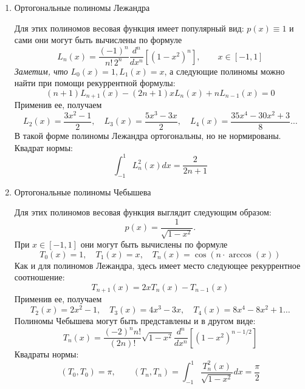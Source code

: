 \begin{enumerate}
    \item Ортогональные полиномы Лежандра
    \vspace{5pt}

    Для этих полиномов весовая функция имеет популярный вид: $p(x) \equiv 1$ и сами они
    могут быть вычислены по формуле
    \begin{equation}
        \displaystyle L_n(x) = \frac{(-1)^n}{n!\, 2^n} \frac{d^n}{dx^n} \left[ \left( 1 - x^2 \right)^n \right], \qquad x \in [-1, 1] \label{eq:legendre}
    \end{equation}
    \emph{Заметим, что} $ \displaystyle L_0(x) = 1, L_1(x) = x$, а следующие полиномы
    можно найти при помощи рекуррентной формулы:
    \begin{equation*}
    (n+1)
        L_{n+1}(x) - (2n+1)xL_n(x) + nL_{n-1}(x) = 0
    \end{equation*}
    Применив ее, получаем
    \begin{equation*}
        L_2(x) = \frac{3x^2-1}{2}, \quad L_3(x) = \frac{5x^3-3x}{2}, \quad L_4(x) = \frac{35x^4-30x^2+3}{8}\dots
    \end{equation*}
    В такой форме полиномы Лежандра ортогональны, но не нормированы. Квадрат нормы:
    \begin{equation*}
        \int_{-1}^{1} L_n^2(x)dx = \frac{2}{2n+1}
    \end{equation*}

    \item Ортогональные полиномы Чебышева
    \vspace{5pt}

    Для этих полиномов весовая функция выглядит следующим образом:
    \begin{equation*}
        p(x) = \frac{1}{\sqrt{1-x^2}}.
    \end{equation*}
    При $x \in [-1, 1]$ они могут быть вычислены по формуле
    \begin{equation}
        T_0(x) = 1, \quad T_1(x) = x, \quad T_n(x) = \cos \left( n \cdot \arccos(x) \right) \label{eq:chebyshev}
    \end{equation}
    Как и для полиномов Лежандра, здесь имеет место следующее рекуррентное соотношение:
    \begin{equation*}
        T_{n+1}(x) = 2xT_n(x) - T_{n-1}(x)
    \end{equation*}
    Применив ее, получаем
    \begin{equation*}
        T_2(x) = 2x^2 - 1, \quad T_3(x) = 4x^3 -3x, \quad T_4(x) = 8x^4 -8x^2 + 1\dots
    \end{equation*}
    Полиномы Чебышева могут быть представлены и в другом виде:
    \begin{equation}
        T_n(x) = \frac{(-2)^n n!}{(2n)!}\sqrt{1-x^2}\frac{d^n}{dx^n}\left[ \left( 1 - x^2 \right)^{n-1/2} \right] \label{eq:chebyshev2}
    \end{equation}
    Квадраты нормы:
    \begin{equation*}
    (T_0, T_0)
        = \pi, \qquad (T_n, T_n) = \int_{-1}^{1} \frac{T_n^2(x)}{\sqrt{1-x^2}}dx = \frac{\pi}{2}
    \end{equation*}
\end{enumerate}
